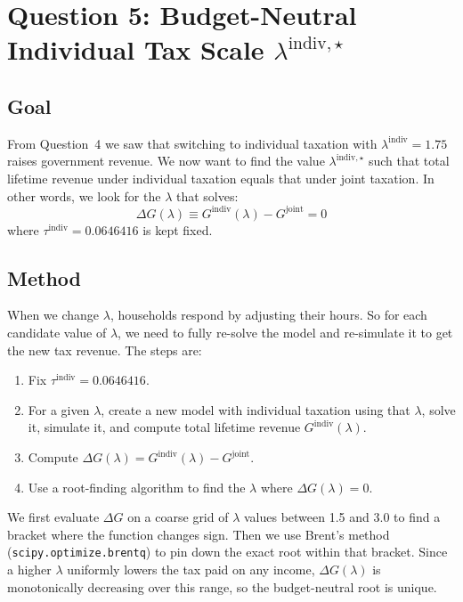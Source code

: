 \section{Question 5: Budget-Neutral Individual Tax Scale $\lambda^{\text{indiv},\star}$}

\subsection*{Goal}

From Question~4 we saw that switching to individual taxation with $\lambda^{\text{indiv}} = 1.75$ raises government revenue. We now want to find the value $\lambda^{\text{indiv},\star}$ such that total lifetime revenue under individual taxation equals that under joint taxation. In other words, we look for the $\lambda$ that solves:
%
\begin{equation}
    \Delta G(\lambda) \equiv G^{\text{indiv}}(\lambda) - G^{\text{joint}} = 0
\end{equation}
%
where $\tau^{\text{indiv}} = 0.0646416$ is kept fixed.

\subsection*{Method}

When we change $\lambda$, households respond by adjusting their hours. So for each candidate value of $\lambda$, we need to fully re-solve the model and re-simulate it to get the new tax revenue. The steps are:

\begin{enumerate}
    \item Fix $\tau^{\text{indiv}} = 0.0646416$.
    \item For a given $\lambda$, create a new model with individual taxation using that $\lambda$, solve it, simulate it, and compute total lifetime revenue $G^{\text{indiv}}(\lambda)$.
    \item Compute $\Delta G(\lambda) = G^{\text{indiv}}(\lambda) - G^{\text{joint}}$.
    \item Use a root-finding algorithm to find the $\lambda$ where $\Delta G(\lambda) = 0$.
\end{enumerate}

We first evaluate $\Delta G$ on a coarse grid of $\lambda$ values between 1.5 and 3.0 to find a bracket where the function changes sign. Then we use Brent's method (\texttt{scipy.optimize.brentq}) to pin down the exact root within that bracket. Since a higher $\lambda$ uniformly lowers the tax paid on any income, $\Delta G(\lambda)$ is monotonically decreasing over this range, so the budget-neutral root is unique.

